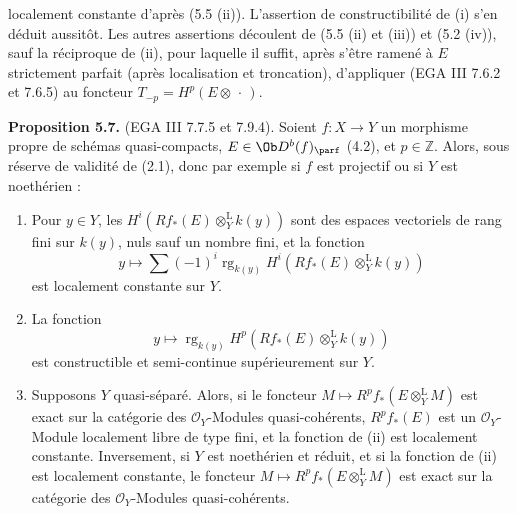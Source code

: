 localement constante d'après (5.5 (ii)). L'assertion de constructibilité de (i) s'en déduit aussitôt. Les autres assertions découlent de (5.5 (ii) et (iii)) et (5.2 (iv)), sauf la réciproque de (ii), pour laquelle il suffit, après s'être ramené à \(E\) strictement parfait (après localisation et troncation), d'appliquer (EGA III 7.6.2 et 7.6.5) au foncteur \(T_{-p}=H^p(E\otimes\,\cdot\,)\).

\textbf{Proposition 5.7.} (EGA III 7.7.5 et 7.9.4). Soient \(f:X\to Y\) un morphisme propre de schémas quasi-compacts, \(E\in\Ob D^b(f)_{\parf}\) (4.2), et \(p\in\mathbb Z\). Alors, sous réserve de validité de (2.1), donc par exemple si \(f\) est projectif ou si \(Y\) est noethérien :
\begin{enumerate}[label=(\roman*)]
\item Pour \(y\in Y\), les \(H^i(Rf_*(E)\otimes_Y^{\mathrm L}k(y))\) sont des espaces vectoriels de rang fini sur \(k(y)\), nuls sauf un nombre fini, et la fonction
\[
 y\longmapsto\sum(-1)^i\operatorname{rg}_{k(y)}H^i(Rf_*(E)\otimes_Y^{\mathrm L}k(y))
\]
est localement constante sur \(Y\).
\item La fonction
\[
 y\longmapsto\operatorname{rg}_{k(y)}H^p(Rf_*(E)\otimes_Y^{\mathrm L}k(y))
\]
est constructible et semi-continue supérieurement sur \(Y\).
\item Supposons \(Y\) quasi-séparé. Alors, si le foncteur \(M\mapsto R^pf_*(E\otimes_Y^{\mathrm L}M)\) est exact sur la catégorie des \(\mathcal O_Y\)-Modules quasi-cohérents, \(R^pf_*(E)\) est un \(\mathcal O_Y\)-Module localement libre de type fini, et la fonction de (ii) est localement constante. Inversement, si \(Y\) est noethérien et réduit, et si la fonction de (ii) est localement constante, le foncteur \(M\mapsto R^pf_*(E\otimes_Y^{\mathrm L}M)\) est exact sur la catégorie des \(\mathcal O_Y\)-Modules quasi-cohérents.
\end{enumerate}

